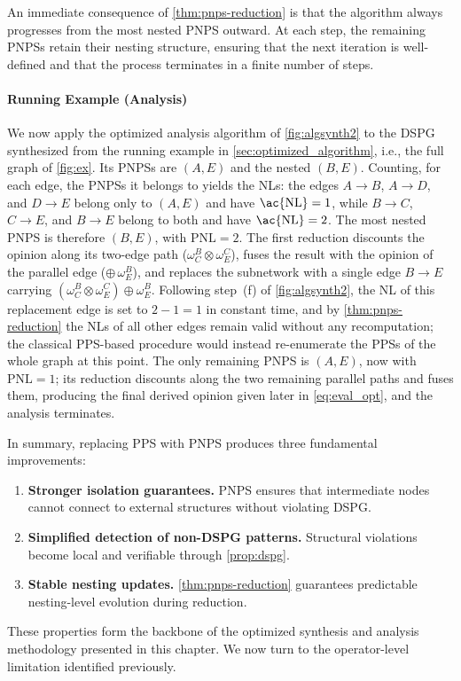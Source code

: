 An immediate consequence of \cref{thm:pnps-reduction} is that the algorithm always progresses from the most nested \ac{PNPS} outward. At each step, the remaining PNPSs retain their nesting structure, ensuring that the next iteration is well-defined and that the process terminates in a finite number of steps.

\paragraph{Running Example (Analysis)}
We now apply the optimized analysis algorithm of \cref{fig:algsynth2} to the \ac{DSPG} synthesized from the running example in \cref{sec:optimized_algorithm}, i.e., the full graph of \cref{fig:ex}. Its \acp{PNPS} are $(A,E)$ and the nested $(B,E)$. Counting, for each edge, the \acp{PNPS} it belongs to yields the \aclp{NL}: the edges $A \to B$, $A \to D$, and $D \to E$ belong only to $(A,E)$ and have $\text{\ac{NL}}=1$, while $B \to C$, $C \to E$, and $B \to E$ belong to both and have $\text{\ac{NL}}=2$. The most nested \ac{PNPS} is therefore $(B,E)$, with $\mathrm{PNL}=2$. The first reduction discounts the opinion along its two-edge path ($\omega_C^B \otimes \omega_E^C$), fuses the result with the opinion of the parallel edge ($\oplus\, \omega_E^B$), and replaces the subnetwork with a single edge $B \to E$ carrying $\left(\omega_C^B \otimes \omega_E^C\right) \oplus \omega_E^B$. Following step~(f) of \cref{fig:algsynth2}, the \ac{NL} of this replacement edge is set to $2-1=1$ in constant time, and by \cref{thm:pnps-reduction} the \aclp{NL} of all other edges remain valid without any recomputation; the classical \ac{PPS}-based procedure would instead re-enumerate the \acp{PPS} of the whole graph at this point. The only remaining \ac{PNPS} is $(A,E)$, now with $\mathrm{PNL}=1$; its reduction discounts along the two remaining parallel paths and fuses them, producing the final derived opinion given later in \cref{eq:eval_opt}, and the analysis terminates.

In summary, replacing \ac{PPS} with \ac{PNPS} produces three fundamental improvements:
\begin{enumerate}
    \item \textbf{Stronger isolation guarantees.}  \ac{PNPS} ensures that intermediate nodes cannot connect to external structures without violating \ac{DSPG}.
    \item \textbf{Simplified detection of non-\ac{DSPG} patterns.} Structural violations become local and verifiable through \cref{prop:dspg}.
    \item \textbf{Stable nesting updates.} \cref{thm:pnps-reduction} guarantees predictable nesting-level evolution during reduction.
\end{enumerate}
These properties form the backbone of the optimized synthesis and analysis methodology presented in this chapter. We now turn to the operator-level limitation identified previously.








